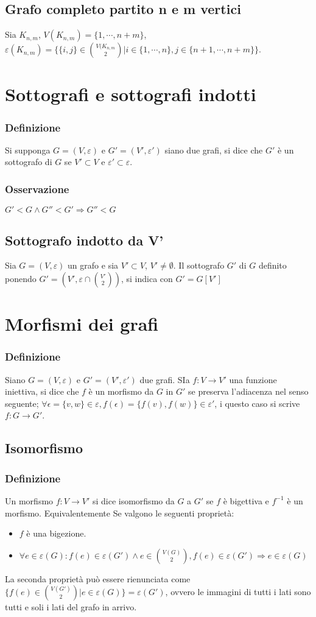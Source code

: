 \subsection{Grafo completo partito n e m vertici}
Sia $K_{n,m}$, $V(K_{n,m})=\{1,\cdots, n+m\}$, $\varepsilon(K_{n,m})=\{\{i,j\}\in\binom{V(K_{n,m}}{2}|i\in\{1,\cdots, n\}, j\in\{n+1,\cdots, n+m\}\}$.
\section{Sottografi e sottografi indotti}
\subsubsection{Definizione}
Si supponga $G=(V,\varepsilon)$ e $G'=(V',\varepsilon')$ siano due grafi, si dice che $G'$ \`e un sottografo di $G$ se $V'\subset V$ e $\varepsilon'\subset\varepsilon$.
\subsubsection{Osservazione}
$G'<G\wedge G''<G'\Rightarrow G''<G$
\subsection{Sottografo indotto da V'}
Sia $G=(V, \varepsilon)$ un grafo e sia $V'\subset V$, $V'\neq\emptyset$. Il sottografo $G'$ di $G$ definito ponendo $G'=(V', \varepsilon\cap\binom{V'}{2})$, si indica con 
$G'=G[V']$
\section{Morfismi dei grafi}
\subsubsection{Definizione}
Siano $G=(V,\varepsilon)$ e $G'=(V',\varepsilon')$ due grafi. SIa $f:V\rightarrow V'$ una funzione iniettiva, si dice che $f$ \`e un morfismo da $G$ in $G'$ se preserva 
l'adiacenza nel senso seguente; $\forall \epsilon=\{v,w\}\in\varepsilon, f(\epsilon)=\{f(v), f(w)\}\in\varepsilon'$, i questo caso si scrive $f:G\rightarrow G'$.
\subsection{Isomorfismo}
\subsubsection{Definizione}
Un morfismo $f:V\rightarrow V'$ si dice isomorfismo da $G$ a $G'$ se $f$ \`e bigettiva e $f^{-1}$ \`e un morfismo. Equivalentemente Se valgono le 
seguenti propriet\`a:
\begin{itemize}
\item $f$ \`e una bigezione.
\item $\forall e\in \varepsilon(G):f(e)\in\varepsilon(G')\wedge e\in\binom{V(G)}{2}, f(e)\in\varepsilon(G')\Rightarrow e\in \varepsilon(G)$
\end{itemize}
La seconda propriet\`a pu\`o essere rienunciata come $\{f(e)\in\binom{V(G')}{2}|e\in\varepsilon(G)\}=\varepsilon(G')$, ovvero le immagini di tutti i lati sono tutti e soli i 
lati del grafo in arrivo.
